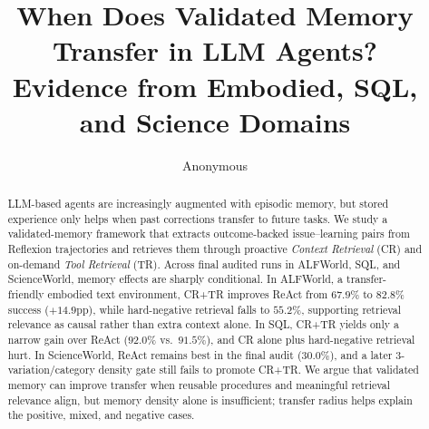 \documentclass[11pt]{article}
\title{When Does Validated Memory Transfer in LLM Agents? \\
Evidence from Embodied, SQL, and Science Domains}
\author{Anonymous}
\begin{document}
\maketitle

\begin{abstract}
LLM-based agents are increasingly augmented with episodic memory, but stored experience only helps when past corrections transfer to future tasks. We study a validated-memory framework that extracts outcome-backed issue--learning pairs from Reflexion trajectories and retrieves them through proactive \emph{Context Retrieval} (CR) and on-demand \emph{Tool Retrieval} (TR). Across final audited runs in ALFWorld, SQL, and ScienceWorld, memory effects are sharply conditional. In ALFWorld, a transfer-friendly embodied text environment, CR+TR improves ReAct from $67.9\%$ to $82.8\%$ success ($+14.9$pp), while hard-negative retrieval falls to $55.2\%$, supporting retrieval relevance as causal rather than extra context alone. In SQL, CR+TR yields only a narrow gain over ReAct ($92.0\%$ vs.\ $91.5\%$), and CR alone plus hard-negative retrieval hurt. In ScienceWorld, ReAct remains best in the final audit ($30.0\%$), and a later 3-variation/category density gate still fails to promote CR+TR. We argue that validated memory can improve transfer when reusable procedures and meaningful retrieval relevance align, but memory density alone is insufficient; transfer radius helps explain the positive, mixed, and negative cases.
\end{abstract}








\end{document}
